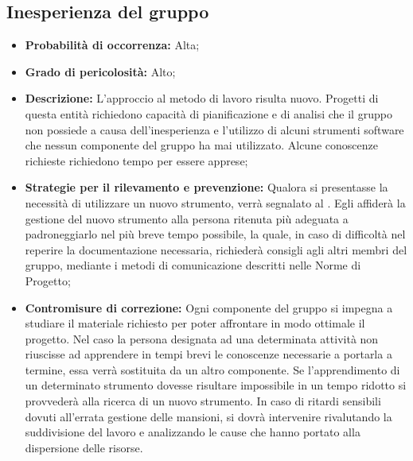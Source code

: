 \subsection{Inesperienza del gruppo}
\begin{itemize}
\item \textbf{Probabilità di occorrenza:} Alta;
\item \textbf{Grado di pericolosità:} Alto;
\item \textbf{Descrizione:} L'approccio al metodo di lavoro risulta nuovo. Progetti di questa entità richiedono capacità di pianificazione e di analisi che il gruppo non possiede a causa dell'inesperienza e l'utilizzo di alcuni strumenti software che nessun componente del gruppo ha mai utilizzato. Alcune conoscenze richieste richiedono tempo per essere apprese;

\item \textbf{Strategie per il rilevamento e prevenzione:} Qualora si presentasse la necessità di utilizzare un nuovo strumento, verrà segnalato al \ruoloResponsabile. Egli affiderà la gestione del nuovo strumento alla persona ritenuta più adeguata a padroneggiarlo nel più breve tempo possibile, la quale, in caso di difficoltà nel reperire la documentazione necessaria, richiederà consigli agli altri membri del gruppo, mediante i metodi di comunicazione descritti nelle Norme di Progetto;

\item \textbf{Contromisure di correzione:} Ogni componente del gruppo si impegna a studiare il materiale richiesto per poter affrontare in modo ottimale il progetto. Nel caso la persona designata ad una determinata attività non riuscisse ad apprendere in tempi brevi le conoscenze necessarie a portarla a termine, essa verrà sostituita da un altro componente. Se l'apprendimento di un determinato strumento dovesse risultare impossibile in un tempo ridotto si provvederà alla ricerca di un nuovo strumento. In caso di ritardi sensibili dovuti all'errata gestione delle mansioni, si dovrà intervenire rivalutando la suddivisione
del lavoro e analizzando le cause che hanno portato alla dispersione delle risorse.
\end{itemize}

